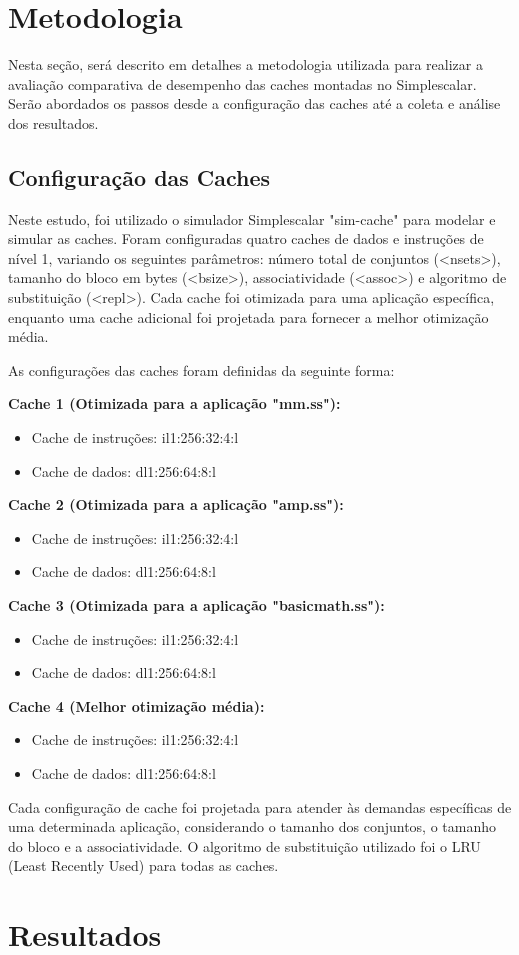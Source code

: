 \documentclass[12pt]{article}
\begin{document}
\section{Metodologia} \label{sec:metodologia}
Nesta seção, será descrito em detalhes a metodologia utilizada para realizar a avaliação comparativa de desempenho das caches montadas no Simplescalar. Serão abordados os passos desde a configuração das caches até a coleta e análise dos resultados.

\subsection{Configuração das Caches}
Neste estudo, foi utilizado o simulador Simplescalar "sim-cache" para modelar e simular as caches. Foram configuradas quatro caches de dados e instruções de nível 1, variando os seguintes parâmetros: número total de conjuntos (\textless nsets\textgreater), tamanho do bloco em bytes (\textless bsize\textgreater), associatividade (\textless assoc\textgreater) e algoritmo de substituição (\textless repl\textgreater). Cada cache foi otimizada para uma aplicação específica, enquanto uma cache adicional foi projetada para fornecer a melhor otimização média.

As configurações das caches foram definidas da seguinte forma:

\textbf{Cache 1 (Otimizada para a aplicação "mm.ss"):}
\begin{itemize}
\item Cache de instruções: il1:256:32:4:l
\item Cache de dados: dl1:256:64:8:l
\end{itemize}

\textbf{Cache 2 (Otimizada para a aplicação "amp.ss"):}
\begin{itemize}
\item Cache de instruções: il1:256:32:4:l
\item Cache de dados: dl1:256:64:8:l
\end{itemize}

\textbf{Cache 3 (Otimizada para a aplicação "basicmath.ss"):}
\begin{itemize}
\item Cache de instruções: il1:256:32:4:l
\item Cache de dados: dl1:256:64:8:l
\end{itemize}

\textbf{Cache 4 (Melhor otimização média):}
\begin{itemize}
\item Cache de instruções: il1:256:32:4:l
\item Cache de dados: dl1:256:64:8:l
\end{itemize}

Cada configuração de cache foi projetada para atender às demandas específicas de uma determinada aplicação, considerando o tamanho dos conjuntos, o tamanho do bloco e a associatividade. O algoritmo de substituição utilizado foi o LRU (Least Recently Used) para todas as caches.


\section{Resultados} \label{sec:resultados}
\end{document}

